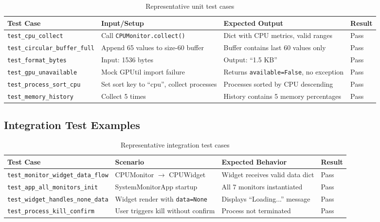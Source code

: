 \documentclass[12pt,a4paper,oneside]{report}
\begin{document}
\begin{table}[h]
\centering
\caption{Representative unit test cases}
\label{tab:unit-tests}
\small
\begin{tabular}{|p{3.5cm}|p{4cm}|p{3cm}|p{1.5cm}|}
\hline
\textbf{Test Case} & \textbf{Input/Setup} & \textbf{Expected Output} & \textbf{Result} \\
\hline
\raggedright\small\texttt{test\_cpu\_\allowbreak{}collect} & Call \texttt{CPUMonitor.\allowbreak{}collect()} & Dict with CPU metrics, valid ranges & Pass \\
\hline
\raggedright\small\texttt{test\_circular\_\allowbreak{}buffer\_full} & Append 65 values to size-60 buffer & Buffer contains last 60 values only & Pass \\
\hline
\raggedright\small\texttt{test\_format\_\allowbreak{}bytes} & Input: 1536 bytes & Output: ``1.5 KB'' & Pass \\
\hline
\raggedright\small\texttt{test\_gpu\_\allowbreak{}unavailable} & Mock GPUtil import failure & Returns \texttt{available=\allowbreak{}False}, no exception & Pass \\
\hline
\raggedright\small\texttt{test\_process\_\allowbreak{}sort\_cpu} & Set sort key to ``cpu'', collect processes & Processes sorted by CPU descending & Pass \\
\hline
\raggedright\small\texttt{test\_memory\_\allowbreak{}history} & Collect 5 times & History contains 5 memory percentages & Pass \\
\hline
\end{tabular}
\end{table}

\subsection{Integration Test Examples}

\begin{table}[h]
\centering
\caption{Representative integration test cases}
\label{tab:integration-tests}
\small
\begin{tabular}{|p{3.5cm}|p{4cm}|p{3cm}|p{1.5cm}|}
\hline
\textbf{Test Case} & \textbf{Scenario} & \textbf{Expected Behavior} & \textbf{Result} \\
\hline
\raggedright\small\texttt{test\_monitor\_\allowbreak{}widget\_data\_\allowbreak{}flow} & CPUMonitor $\rightarrow$ CPUWidget & Widget receives valid data dict & Pass \\
\hline
\raggedright\small\texttt{test\_app\_all\_\allowbreak{}monitors\_init} & SystemMonitorApp startup & All 7 monitors instantiated & Pass \\
\hline
\raggedright\small\texttt{test\_widget\_\allowbreak{}handles\_none\_\allowbreak{}data} & Widget render with \texttt{data=None} & Displays ``Loading...'' message & Pass \\
\hline
\raggedright\small\texttt{test\_process\_\allowbreak{}kill\_confirm} & User triggers kill without confirm & Process not terminated & Pass \\
\hline
\end{tabular}
\end{table}
\end{document}
